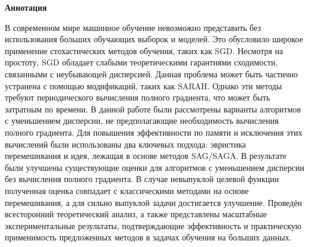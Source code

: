 \begin{center}
    \Large{\textbf{Аннотация}}
\end{center}

    В современном мире машинное обучение невозможно представить без использования больших обучающих выборок и моделей. Это обусловило широкое применение стохастических методов обучения, таких как \textsc{SGD}. Несмотря на простоту, \textsc{SGD} обладает слабыми теоретическими гарантиями сходимости, связанными с неубывающей дисперсией. Данная проблема может быть частично устранена с помощью модификаций, таких как \textsc{SARAH}. Однако эти методы требуют периодического вычисления полного градиента, что может быть затратным по времени. В данной работе были рассмотрены варианты алгоритмов с уменьшением дисперсии, не предполагающие необходимость вычисления полного градиента. Для повышения эффективности по памяти и исключения этих вычислений были использованы два ключевых подхода: эвристика перемешивания и идея, лежащая в основе методов \textsc{SAG/SAGA}. В результате были улучшены существующие оценки для алгоритмов с уменьшением дисперсии без вычисления полного градиента. В случае невыпуклой целевой функции полученная оценка совпадает с классическими методами на основе перемешивания, а для сильно выпуклой задачи достигается улучшение. Проведён всесторонний теоретический анализ, а также представлены масштабные экспериментальные результаты, подтверждающие эффективность и практическую применимость предложенных методов в задачах обучения на больших данных.